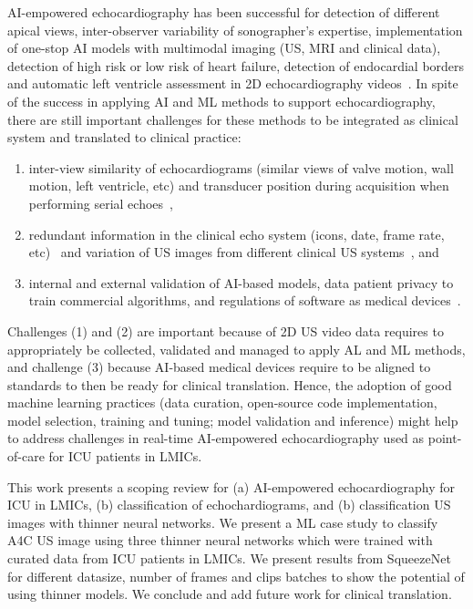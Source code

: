 \documentclass[mlabstract,twocolumn]{jmlr}
\begin{document}
AI-empowered echocardiography has been successful for detection of different apical views, inter-observer variability of sonographer's expertise, implementation of one-stop AI models with multimodal imaging (US, MRI and clinical data), detection of high risk or low risk of heart failure, detection of endocardial borders and automatic left ventricle assessment in 2D echocardiography videos~\citep{tromp2022, zhang2022-mdpi, behnami2020, ono2022}.
In spite of the success in applying AI and ML methods to support echocardiography, there are still important challenges for these methods to be integrated as clinical system and translated to clinical practice:
\begin{enumerate}
\setlength\itemsep{0em}
\item inter-view similarity of echocardiograms (similar views of valve motion, wall motion, left ventricle, etc) and transducer position during acquisition when performing serial echoes~\citep{zhang2018},
\item redundant information in the clinical echo system (icons, date, frame rate, etc)~\citep{khamis2017} and variation of US images from different clinical US systems~\citep{brindise2020unsupervised}, and
\item internal and external validation of AI-based models, data patient privacy to train commercial algorithms, and regulations of software as medical devices~\citep{2022_Stewart_Emergency_Medicine_Australasia}.
\end{enumerate}
Challenges (1) and (2) are important because of 2D US video data requires to appropriately be collected, validated and managed to apply AL and ML methods, and challenge (3) because AI-based medical devices require to be aligned to standards to then be ready for clinical translation.
Hence, the adoption of good machine learning practices (data curation, open-source code implementation, model selection, training and tuning; model validation and inference) might help to address challenges in real-time AI-empowered echocardiography used as point-of-care for ICU patients in LMICs.

This work presents a scoping review for (a) AI-empowered echocardiography for ICU in LMICs, (b) classification of echochardiograms, and (b) classification US images with thinner neural networks.
We present a ML case study to classify A4C US image using three thinner neural networks which were trained with curated data from ICU patients in LMICs.
We present results from SqueezeNet for different datasize, number of frames and clips batches to show the potential of using thinner models.
We conclude and add future work for clinical translation.
\end{document}
